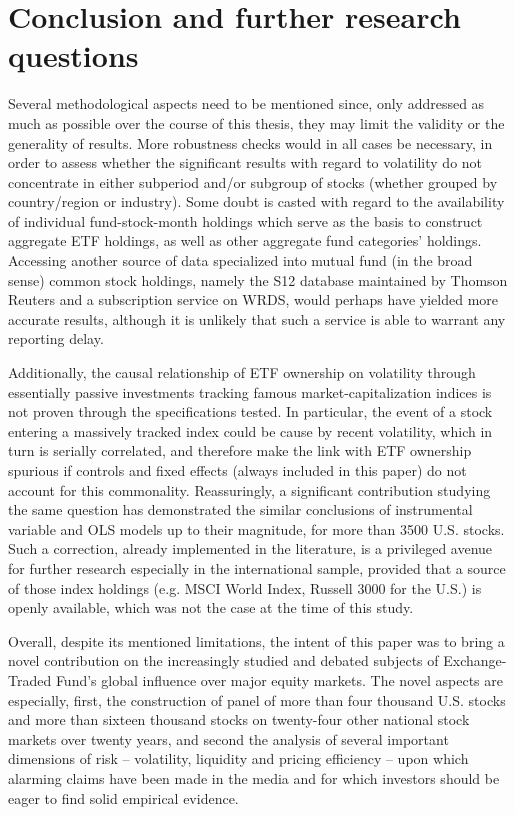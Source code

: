 \section{Conclusion and further research questions}
\label{sec:Conclusion}


Several methodological aspects need to be mentioned since, only addressed as much as possible over the course of this thesis, they may limit the validity or the generality of results. More robustness checks would in all cases be necessary, in order to assess whether the significant results with regard to volatility do not concentrate in either subperiod and/or subgroup of stocks (whether grouped by country/region or industry). Some doubt is casted with regard to the availability of individual fund-stock-month holdings which serve as the basis to construct aggregate ETF holdings, as well as other aggregate fund categories' holdings. Accessing another source of data specialized into mutual fund (in the broad sense) common stock holdings, namely the S12 database maintained by Thomson Reuters and a subscription service on WRDS, would perhaps have yielded more accurate results, although it is unlikely that such a service is able to warrant any reporting delay.

Additionally, the causal relationship of ETF ownership on volatility through essentially passive investments tracking famous market-capitalization indices is not proven through the specifications tested. In particular, the event of a stock entering a massively tracked index could be cause by recent volatility, which in turn is serially correlated, and therefore make the link with ETF ownership spurious if controls and fixed effects (always included in this paper) do not account for this commonality. Reassuringly, a significant contribution studying the same question \parencite{Ben-David2018} has demonstrated the similar conclusions of instrumental variable and OLS models up to their magnitude, for more than 3500 U.S. stocks. Such a correction, already implemented in the literature, is a privileged avenue for further research especially in the international sample, provided that a source of those index holdings (e.g. MSCI World Index, Russell 3000 for the U.S.) is openly available, which was not the case at the time of this study.

Overall, despite its mentioned limitations, the intent of this paper was to bring a novel contribution on the increasingly studied and debated subjects of Exchange-Traded Fund's global influence over major equity markets. The novel aspects are especially, first, the construction of panel of more than four thousand U.S. stocks and more than sixteen thousand stocks on twenty-four other national stock markets over twenty years, and second the analysis of several important dimensions of risk -- volatility, liquidity and pricing efficiency -- upon which alarming claims have been made in the media and for which investors should be eager to find solid empirical evidence.
